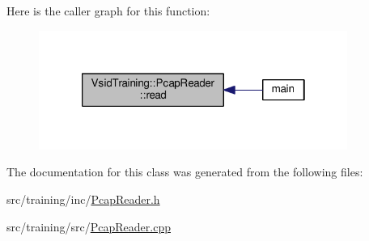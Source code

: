 Here is the caller graph for this function\-:
\nopagebreak
\begin{figure}[H]
\begin{center}
\leavevmode
\includegraphics[width=286pt]{class_vsid_training_1_1_pcap_reader_ae1d647bb7d299a9803389b8bebc529ee_icgraph}
\end{center}
\end{figure}




The documentation for this class was generated from the following files\-:\begin{DoxyCompactItemize}
\item 
src/training/inc/\hyperlink{training_2inc_2_pcap_reader_8h}{Pcap\-Reader.\-h}\item 
src/training/src/\hyperlink{training_2src_2_pcap_reader_8cpp}{Pcap\-Reader.\-cpp}\end{DoxyCompactItemize}
